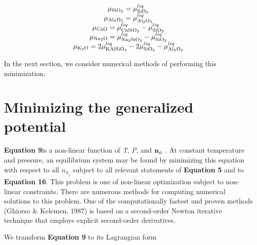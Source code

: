\documentclass[11pt, titlepage, twoside]{article}
\begin{document}
\begin{MPEquation}[!ht]
\begin{equation}
\begin{array}{c}
{\mu _{{\rm{Si}}{{\rm{O}}_2}}} = \mu _{{\rm{Si}}{{\rm{O}}_2}}^{liq}\\
{\mu _{{\rm{A}}{{\rm{l}}_2}{{\rm{O}}_3}}} = \mu _{{\rm{A}}{{\rm{l}}_2}{{\rm{O}}_3}}^{liq}\\
{\mu _{{\rm{CaO}}}} = \mu _{{\rm{CaSi}}{{\rm{O}}_3}}^{liq} - \mu _{{\rm{Si}}{{\rm{O}}_2}}^{liq}\\
{\mu _{{\rm{N}}{{\rm{a}}_2}{\rm{O}}}} = \mu _{{\rm{N}}{{\rm{a}}_2}{\rm{Si}}{{\rm{O}}_3}}^{liq} - \mu _{{\rm{Si}}{{\rm{O}}_2}}^{liq}\\
{\mu _{{{\rm{K}}_2}{\rm{O}}}} = 2\mu _{{\rm{KAlSi}}{{\rm{O}}_4}}^{liq} - 2\mu _{{\rm{Si}}{{\rm{O}}_2}}^{liq} - \mu _{{\rm{A}}{{\rm{l}}_2}{{\rm{O}}_3}}^{liq}
\end{array}
\end{equation}
\label{MPEquationElement:45C36947-1A6B-47E2-D97B-ADE11D29DE38}
\end{MPEquation}
In the next section, we consider numerical methods of performing this minimization.


\section{Minimizing the generalized potential}\label{MPSection:6045E840-FBB7-42D4-CF25-DB09CCE21CCD}

\textbf{Equation 9}is a non-linear function of \emph{T}, \emph{P}, and ${{\bf{n}}_\phi }$ . At constant temperature and pressure, an equilibrium system may be found by minimizing this equation with respect to all ${n_{{\phi _j}}}$ subject to all relevant statements of \textbf{Equation 5} and to \textbf{Equation 16}. This problem is one of non-linear optimization subject to non-linear constraints. There are numerous methods for computing numerical solutions to this problem. One of the computationally fastest and proven methods (Ghiorso \& Kelemen, 1987) is based on a second-order Newton iterative technique that employs explicit second-order derivatives.

We transform \textbf{Equation 9} to its Lagrangian form
\end{document}
